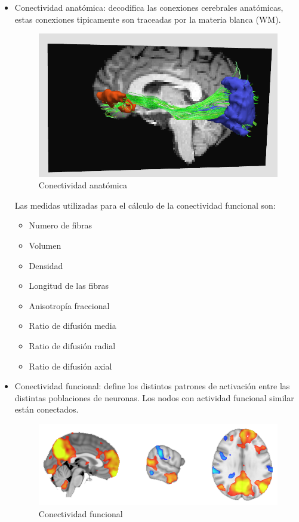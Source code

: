 \begin{itemize}

	\item Conectividad anatómica: decodifica las conexiones cerebrales anatómicas, estas conexiones tipicamente son traceadas por la materia blanca (WM).
	\begin{figure}[H]
  		\centering
    	\includegraphics[scale=0.5]{img/anat_conect.png}
  		\caption{Conectividad anatómica}         \label{preproc:anat_conect}
	\end{figure}
	
	Las medidas utilizadas para el cálculo de la conectividad funcional son:
	\begin{itemize}
		\item Numero de fibras
		\item Volumen
		\item Densidad
		\item Longitud de las fibras
		\item Anisotropía fraccional
		\item Ratio de difusión media
		\item Ratio de difusión radial
		\item Ratio de difusión axial
	\end{itemize}
	
	\item Conectividad funcional: define los distintos patrones de activación entre las distintas poblaciones de neuronas. Los nodos con actividad funcional similar están conectados.
	
	\begin{figure}[H]
  		\centering
    	\includegraphics[scale=0.5]{img/func_conect.png}
  		\caption{Conectividad funcional}\label{preproc:func_conect}
	\end{figure}
	

\end{itemize}
